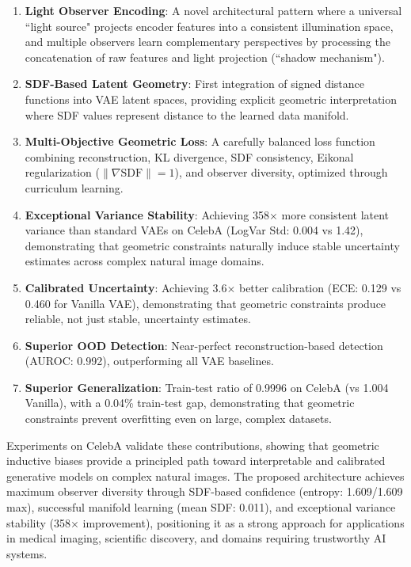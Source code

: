 \documentclass[10pt,twocolumn,letterpaper]{article}
\begin{document}
\begin{enumerate}
    \item \textbf{Light Observer Encoding}: A novel architectural pattern where a universal ``light source" projects encoder features into a consistent illumination space, and multiple observers learn complementary perspectives by processing the concatenation of raw features and light projection (``shadow mechanism").

    \item \textbf{SDF-Based Latent Geometry}: First integration of signed distance functions into VAE latent spaces, providing explicit geometric interpretation where SDF values represent distance to the learned data manifold.

    \item \textbf{Multi-Objective Geometric Loss}: A carefully balanced loss function combining reconstruction, KL divergence, SDF consistency, Eikonal regularization ($\|\nabla \text{SDF}\| = 1$), and observer diversity, optimized through curriculum learning.

    \item \textbf{Exceptional Variance Stability}: Achieving 358$\times$ more consistent latent variance than standard VAEs on CelebA (LogVar Std: 0.004 vs 1.42), demonstrating that geometric constraints naturally induce stable uncertainty estimates across complex natural image domains.

    \item \textbf{Calibrated Uncertainty}: Achieving 3.6$\times$ better calibration (ECE: 0.129 vs 0.460 for Vanilla VAE), demonstrating that geometric constraints produce reliable, not just stable, uncertainty estimates.

    \item \textbf{Superior OOD Detection}: Near-perfect reconstruction-based detection (AUROC: 0.992), outperforming all VAE baselines.

    \item \textbf{Superior Generalization}: Train-test ratio of 0.9996 on CelebA (vs 1.004 Vanilla), with a 0.04\% train-test gap, demonstrating that geometric constraints prevent overfitting even on large, complex datasets.
\end{enumerate}

Experiments on CelebA validate these contributions, showing that geometric inductive biases provide a principled path toward interpretable and calibrated generative models on complex natural images. The proposed architecture achieves maximum observer diversity through SDF-based confidence (entropy: 1.609/1.609 max), successful manifold learning (mean SDF: 0.011), and exceptional variance stability (358$\times$ improvement), positioning it as a strong approach for applications in medical imaging, scientific discovery, and domains requiring trustworthy AI systems.
\end{document}
